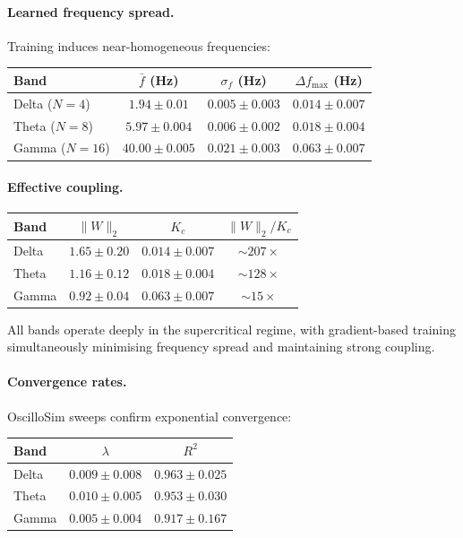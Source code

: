 \documentclass[11pt]{article}
\begin{document}
\paragraph{Learned frequency spread.}
Training induces near-homogeneous frequencies:

\begin{center}
\begin{tabular}{lccc}
\toprule
Band & $\bar{f}$ (Hz) & $\sigma_f$ (Hz) & $\Delta f_{\max}$ (Hz) \\
\midrule
Delta ($N{=}4$)  & $1.94 \pm 0.01$ & $0.005 \pm 0.003$ & $0.014 \pm 0.007$ \\
Theta ($N{=}8$)  & $5.97 \pm 0.004$ & $0.006 \pm 0.002$ & $0.018 \pm 0.004$ \\
Gamma ($N{=}16$) & $40.00 \pm 0.005$ & $0.021 \pm 0.003$ & $0.063 \pm 0.007$ \\
\bottomrule
\end{tabular}
\end{center}

\paragraph{Effective coupling.}

\begin{center}
\begin{tabular}{lccc}
\toprule
Band & $\|W\|_2$ & $K_c$ & $\|W\|_2 / K_c$ \\
\midrule
Delta & $1.65 \pm 0.20$ & $0.014 \pm 0.007$ & $\sim\!207\times$ \\
Theta & $1.16 \pm 0.12$ & $0.018 \pm 0.004$ & $\sim\!128\times$ \\
Gamma & $0.92 \pm 0.04$ & $0.063 \pm 0.007$ & $\sim\!15\times$ \\
\bottomrule
\end{tabular}
\end{center}

All bands operate deeply in the supercritical regime, with gradient-based
training simultaneously minimising frequency spread and maintaining strong
coupling.

\paragraph{Convergence rates.}
OscilloSim sweeps confirm exponential convergence:

\begin{center}
\begin{tabular}{lcc}
\toprule
Band & $\lambda$ & $R^2$ \\
\midrule
Delta & $0.009 \pm 0.008$ & $0.963 \pm 0.025$ \\
Theta & $0.010 \pm 0.005$ & $0.953 \pm 0.030$ \\
Gamma & $0.005 \pm 0.004$ & $0.917 \pm 0.167$ \\
\bottomrule
\end{tabular}
\end{center}
\end{document}
